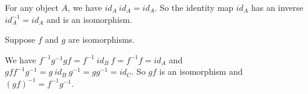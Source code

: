 For any object $A$, we have $id_A ~ id_A = id_A$. So the identity map $id_A$ has an inverse $id_A^{-1} = id_A$ and is an isomorphism.

Suppose $f$ and $g$ are isomorphisms.
\begin{center}\end{center}
We have $f^{-1} g^{-1} g f = f^{-1} ~ id_B ~ f = f^{-1} f = id_A$ and $g f f^{-1} g^{-1} = g ~ id_B ~ g^{-1} = g g^{-1} = id_C$. So $gf$ is an isomorphism and $(gf)^{-1} = f^{-1} g^{-1}$.